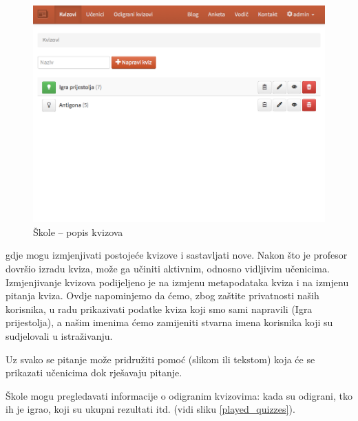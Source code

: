\documentclass[11pt]{scrreprt}
\begin{document}
\begin{figure}[H]
  \includegraphics[width=\textwidth, clip=true, trim=0 10cm 0 0, fbox]{school/quizzes}
  \caption{Škole -- popis kvizova}
  \label{fig:school/quizzes}
\end{figure}

gdje mogu izmjenjivati postojeće kvizove i sastavljati nove. Nakon što je
profesor dovršio izradu kviza, može ga učiniti aktivnim, odnosno vidljivim
učenicima. Izmjenjivanje kvizova podijeljeno je na izmjenu metapodataka kviza i
na izmjenu pitanja kviza. Ovdje napominjemo da ćemo, zbog zaštite privatnosti
naših korisnika, u radu prikazivati podatke kviza koji smo sami napravili (Igra
prijestolja), a našim imenima ćemo zamijeniti stvarna imena korisnika koji su
sudjelovali u istraživanju.

Uz svako se pitanje može pridružiti pomoć (slikom ili tekstom) koja će se
prikazati učenicima dok rješavaju pitanje.

Škole mogu pregledavati informacije o odigranim kvizovima: kada su odigrani,
tko ih je igrao, koji su ukupni rezultati itd. (vidi sliku \ref{played_quizzes}).
\end{document}
